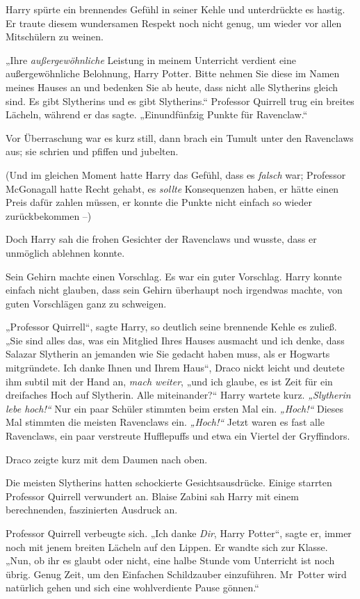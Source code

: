 {Harry spürte ein brennendes Gefühl in seiner Kehle und unterdrückte es hastig. Er traute diesem wundersamen Respekt noch nicht genug, um wieder vor allen Mitschülern zu weinen.

„Ihre \emph{außergewöhnliche} Leistung in meinem Unterricht verdient eine außergewöhnliche Belohnung, Harry Potter. Bitte nehmen Sie diese im Namen meines Hauses an und bedenken Sie ab heute, dass nicht alle Slytherins gleich sind. Es gibt Slytherins und es gibt Slytherins.“ Professor Quirrell trug ein breites Lächeln, während er das sagte. „Einundfünfzig Punkte für Ravenclaw.“

Vor Überraschung war es kurz still, dann brach ein Tumult unter den Ravenclaws aus; sie schrien und pfiffen und jubelten.

(Und im gleichen Moment hatte Harry das Gefühl, dass es \emph{falsch} war; Professor McGonagall hatte Recht gehabt, es \emph{sollte} Konsequenzen haben, er hätte einen Preis dafür zahlen müssen, er konnte die Punkte nicht einfach so wieder zurückbekommen --)

Doch Harry sah die frohen Gesichter der Ravenclaws und wusste, dass er unmöglich ablehnen konnte.

Sein Gehirn machte einen Vorschlag. Es war ein guter Vorschlag. Harry konnte einfach nicht glauben, dass sein Gehirn überhaupt noch irgendwas machte, von guten Vorschlägen ganz zu schweigen.

„Professor Quirrell“, sagte Harry, so deutlich seine brennende Kehle es zuließ. „Sie sind alles das, was ein Mitglied Ihres Hauses ausmacht und ich denke, dass Salazar Slytherin an jemanden wie Sie gedacht haben muss, als er Hogwarts mitgründete. Ich danke Ihnen und Ihrem Haus“, Draco nickt leicht und deutete ihm subtil mit der Hand an, \emph{mach weiter}, „und ich glaube, es ist Zeit für ein dreifaches Hoch auf Slytherin. Alle miteinander?“ Harry wartete kurz. \emph{„Slytherin lebe hoch!“} Nur ein paar Schüler stimmten beim ersten Mal ein. \emph{„Hoch!“} Dieses Mal stimmten die meisten Ravenclaws ein. \emph{„Hoch!“} Jetzt waren es fast alle Ravenclaws, ein paar verstreute Hufflepuffs und etwa ein Viertel der Gryffindors.

Draco zeigte kurz mit dem Daumen nach oben.

Die meisten Slytherins hatten schockierte Gesichtsausdrücke. Einige starrten Professor Quirrell verwundert an. Blaise Zabini sah Harry mit einem berechnenden, faszinierten Ausdruck an.

Professor Quirrell verbeugte sich. „Ich danke \emph{Dir}, Harry Potter“, sagte er, immer noch mit jenem breiten Lächeln auf den Lippen. Er wandte sich zur Klasse. „Nun, ob ihr es glaubt oder nicht, eine halbe Stunde vom Unterricht ist noch übrig. Genug Zeit, um den Einfachen Schildzauber einzuführen. Mr~Potter wird natürlich gehen und sich eine wohlverdiente Pause gönnen.“

}
